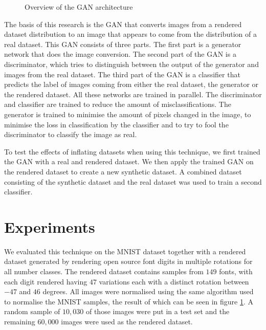 \documentclass[10pt,twocolumn,letterpaper]{article}
\begin{document}
\begin{figure}[h]
\begin{center}
{\scriptsize }
\end{center}
   \caption{Overview of the GAN architecture}
\label{fig:example-font-images}
\end{figure}

The basis of this research is the GAN that converts images from a rendered dataset distribution to an image that appears to come from the distribution of a real dataset. This GAN consists of three parts. The first part is a generator network that does the image conversion. The second part of the GAN is a discriminator, which tries to distinguish between the output of the generator and images from the real dataset. The third part of the GAN is a classifier that predicts the label of images coming from either the real dataset, the generator or the rendered dataset. All these networks are trained in parallel. The discriminator and classifier are trained to reduce the amount of misclassifications. The generator is trained to minimise the amount of pixels changed in the image, to minimise the loss in classification by the classifier and to try to fool the discriminator to classify the image as real.

To test the effects of inflating datasets when using this technique, we first trained the GAN with a real and rendered dataset. We then apply the trained GAN on the rendered dataset to create a new synthetic dataset. A combined dataset consisting of the synthetic dataset and the real dataset was used to train a second classifier.

\section{Experiments}


We evaluated this technique on the MNIST dataset \cite{mnist} together with a rendered dataset generated by rendering open source font digits in multiple rotations for all number classes.
The rendered dataset contains samples from $149$ fonts, with each digit rendered having $47$ variations each with a distinct rotation between $-47$ and $46$ degrees. All images were normalised using the same algorithm used to normalise the MNIST samples, the result of which can be seen in figure \ref{fig:example-font-images}. A random sample of $10,030$ of those images were put in a test set and the remaining $60,000$ images were used as the rendered dataset.
\end{document}
